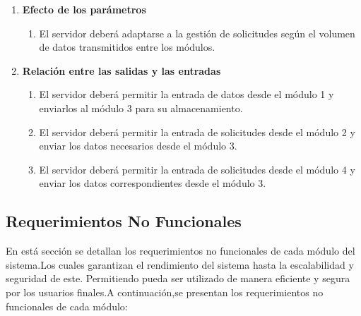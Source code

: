 \begin{enumerate}
\begin{enumerate}
            \item \textbf{Efecto de los parámetros}
                \begin{enumerate}
                    \item El servidor deberá adaptarse a la gestión de solicitudes según el volumen de datos transmitidos entre los módulos.
                \end{enumerate}   
        
            \item \textbf{Relación entre las salidas y las entradas}
                \begin{enumerate}
                    \item El servidor deberá permitir la entrada de datos desde el módulo 1 y enviarlos al módulo 3 para su almacenamiento.
                    \item El servidor deberá permitir la entrada de solicitudes desde el módulo 2 y enviar los datos necesarios desde el módulo 3.
                    \item El servidor deberá permitir la entrada de solicitudes desde el módulo 4 y enviar los datos correspondientes desde el módulo 3.
                \end{enumerate}
    \end{enumerate}
      
 \end{enumerate}


 \subsection{Requerimientos No Funcionales}

    En está sección se detallan los requerimientos no funcionales de cada módulo del sistema.Los cuales
    garantizan el rendimiento del sistema hasta la escalabilidad y seguridad de este. Permitiendo pueda
    ser utilizado de manera eficiente y segura por los usuarios finales.A continuación,se presentan los requerimientos no funcionales
    de cada módulo:

